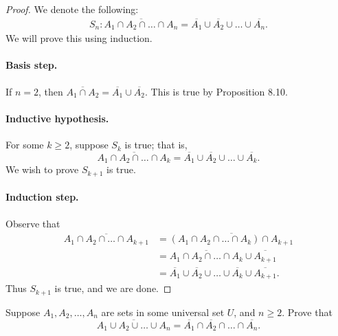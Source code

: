 \documentclass{exam}
\begin{document}
\begin{proof}
    We denote the following:
    \begin{align*}
        S_n:\overline{A_1\cap A_2\cap\dots\cap A_n}=\overline{A_1}\cup\overline{A_2}\cup\dots\cup\overline{A_n}.
    \end{align*}
    We will prove this using induction.
    \paragraph{Basis step.} If $n =2$, then $\overline{A_1\cap A_2}=\overline{A_1}\cup\overline{A_2}$. This is true by Proposition 8.10.
    \paragraph{Inductive hypothesis.} For some $k\ge 2$, suppose $S_k$ is true; that is, $$\overline{A_1\cap A_2\cap\dots\cap A_k}=\overline{A_1}\cup\overline{A_2}\cup\dots\cup\overline{A_k}.$$ We wish to prove $S_{k+1}$ is true.
    \paragraph{Induction step.} Observe that
    \begin{align*}
        \overline{A_1\cap A_2\cap\dots\cap A_{k+1}}&=\overline{(A_1\cap A_2\cap\dots\cap A_k)\cap A_{k+1}}\\
        &=\overline{A_1\cap A_2\cap\dots\cap A_k}\cup\overline{A_{k+1}}\\
        &=\overline{A_1}\cup\overline{A_2}\cup\dots\cup\overline{A_k}\cup\overline{A_{k+1}}.
    \end{align*}
    Thus $S_{k+1}$ is true, and we are done.
\end{proof}

\begin{proposition}{10.18}
    Suppose $A_1, A_2,\dots,A_n$ are sets in some universal set $U$, and $n\ge2$. Prove that $$\overline{A_1\cup A_2\cup\dots\cup A_n}=\overline{A_1}\cap\overline{A_2}\cap\dots\cap\overline{A_n}.$$
\end{proposition}
\end{document}
